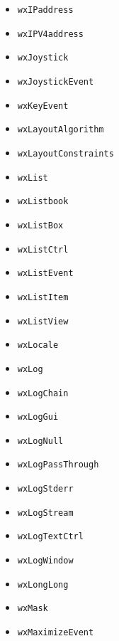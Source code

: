 \documentclass[a4paper,11pt,oneside,titlepage]{report}
\begin{document}
\begin{itemize}
\item \texttt{wxIPaddress}
\item \texttt{wxIPV4address}
\item \texttt{wxJoystick}
\item \texttt{wxJoystickEvent}
\item \texttt{wxKeyEvent}
\item \texttt{wxLayoutAlgorithm}
\item \texttt{wxLayoutConstraints}
\item \texttt{wxList}
\item \texttt{wxListbook}
\item \texttt{wxListBox}
\item \texttt{wxListCtrl}
\item \texttt{wxListEvent}
\item \texttt{wxListItem}
\item \texttt{wxListView}
\item \texttt{wxLocale}
\item \texttt{wxLog}
\item \texttt{wxLogChain}
\item \texttt{wxLogGui}
\item \texttt{wxLogNull}
\item \texttt{wxLogPassThrough}
\item \texttt{wxLogStderr}
\item \texttt{wxLogStream}
\item \texttt{wxLogTextCtrl}
\item \texttt{wxLogWindow}
\item \texttt{wxLongLong}
\item \texttt{wxMask}
\item \texttt{wxMaximizeEvent}


\end{itemize}
\end{document}
